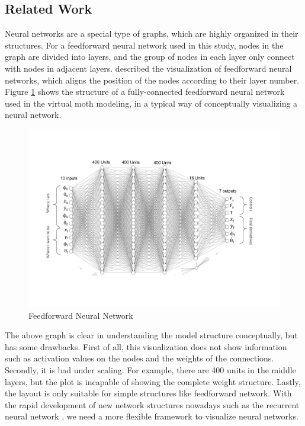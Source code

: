\documentclass[sigchi]{acmart}
\begin{document}
\subsection{Related Work}
Neural networks are a special type of graphs, which are highly organized in their structures. For a feedforward neural network used in this study, nodes in the graph are divided into layers, and the group of nodes in each layer only connect with nodes in adjacent layers. \cite{bischof1992visualization} described the visualization of feedforward neural networks, which aligns the position of the nodes according to their layer number. Figure \ref{ffnn} shows the structure of a fully-connected feedforward neural network used in the virtual moth modeling, in a typical way of conceptually visualizing a neural network.  
\begin{figure}[h]
  \centering
  \includegraphics[width=\linewidth]{ffnn.pdf}
  \caption{Feedforward Neural Network}
  \label{ffnn}
\end{figure}

The above graph is clear in understanding the model structure conceptually, but has some drawbacks. First of all, this visualization does not show information such as activation values on the nodes and the weights of the connections. Secondly, it is bad under scaling. For example, there are 400 units in the middle layers, but the plot is incapable of showing the complete weight structure. Lastly, the layout is only suitable for simple structures like feedforward network. With the rapid development of new network structures nowadays such as the recurrent neural network \cite{rumelhart1988learning}, we need a more flexible framework to visualize neural networks.
\end{document}
